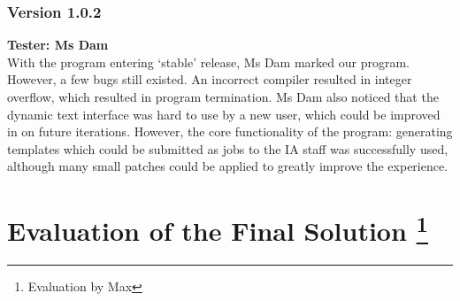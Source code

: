 \documentclass[oneside,openany,11pt,a4paper]{report}
\begin{document}
\subsubsection{Version 1.0.2}
\textbf{Tester: Ms Dam} \\
With the program entering ‘stable’ release, Ms Dam marked our program. However, a few bugs still existed.
An incorrect compiler resulted in integer overflow, which resulted in program termination. Ms Dam also noticed that the dynamic text interface
was hard to use by a new user, which could be improved in on future iterations. However, the core functionality of the program: generating
templates which could be submitted as jobs to the IA staff was successfully used, although many small patches could be applied to greatly
improve the experience.


\section{Evaluation of the Final Solution \protect\footnote{Evaluation by Max}}
\end{document}
